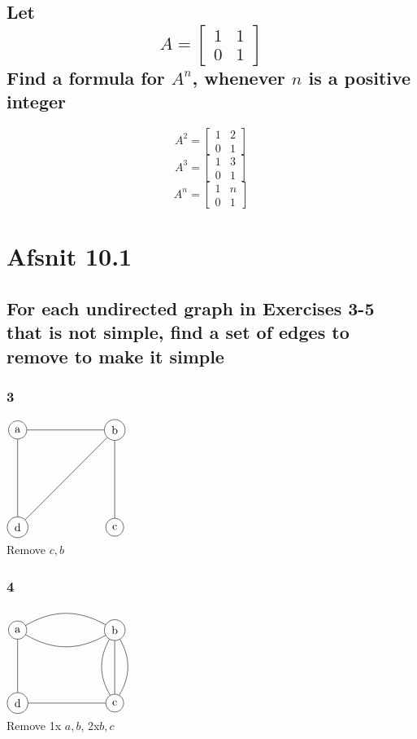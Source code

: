 \documentclass[12pt, a4paper]{report}
\begin{document}
		\subsection{Let $$A=\begin{bmatrix}1&1\\0&1\end{bmatrix}$$ Find a formula for $A^n$, whenever $n$ is a positive integer}
			$$A^2=\begin{bmatrix}1&2\\0&1\end{bmatrix}$$
			$$A^3=\begin{bmatrix}1&3\\0&1\end{bmatrix}$$
			$$A^n=\begin{bmatrix}1&n\\0&1\end{bmatrix}$$
	\setcounter{section}{0}
	\section{Afsnit 10.1}
		\setcounter{subsection}{9}
		\subsection{For each undirected graph in Exercises 3-5 that is not simple, find a set of edges to remove to make it simple}
			\setcounter{subsubsection}{2}
			\subsubsection{3}
				$\begin{tikzpicture}[scale=3]
						\tikzstyle{vertex}=[circle,draw=black]
						\node[vertex](v1) at (0,0){d};
						\node[vertex](v2) at (1,0){c};
						\node[vertex](v4) at (0,1) {a};
						\node[vertex](v3) at (1,1) {b};
						\path[-]
							(v2) edge node {}(v3)
							(v4) edge node {}(v1)
							(v3) edge node {}(v4)
							(v3) edge node {}(v1);
					\end{tikzpicture}$\\
					Remove $c,b$
			\subsubsection{4}
			$\begin{tikzpicture}[scale=3]
					\tikzstyle{vertex}=[circle,draw=black]
					\node[vertex](v1) at (0,0.75) {a};
					\node[vertex](v2) at (1,0.75) {b};
					\node[vertex](v3) at (1,0) {c};
					\node[vertex](v4) at (0,0) {d};
   					\draw (v1) to [bend right=-30] (v2);
   					\draw (v1) to [bend right=30] (v2);
					\draw (v1) to (v4);
   					\draw (v4) to [text={"e_1"}] (v3);
   					\draw (v2) to [bend left=30, text={"e_3"}] (v3);
   					\draw (v2) to [bend right=30] (v3);
					\draw (v2) -- (v3) node [midway] {};
				\end{tikzpicture}$\\
					Remove 1x $a,b$, 2x$b,c$
\end{document}
